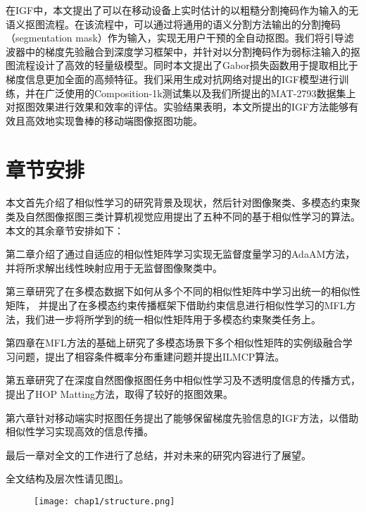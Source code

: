 在IGF中，本文提出了可以在移动设备上实时估计的以粗糙分割掩码作为输入的无语义抠图流程。在该流程中，可以通过将通用的语义分割方法输出的分割掩码（segmentation mask）作为输入，实现无用户干预的全自动抠图。我们将引导滤波器\cite{he2010guided}中的梯度先验融合到深度学习框架中，并针对以分割掩码作为弱标注输入的抠图流程设计了高效的轻量级模型。同时本文提出了Gabor损失函数用于提取相比于梯度信息更加全面的高频特征。我们采用生成对抗网络对提出的IGF模型进行训练，并在广泛使用的Composition-1k测试集以及我们所提出的MAT-2793数据集上对抠图效果进行效果和效率的评估。实验结果表明，本文所提出的IGF方法能够有效且高效地实现鲁棒的移动端图像抠图功能。



\section{章节安排}
本文首先介绍了相似性学习的研究背景及现状，然后针对图像聚类、多模态约束聚类及自然图像抠图三类计算机视觉应用提出了五种不同的基于相似性学习的算法。
本文的其余章节安排如下：

第二章介绍了通过自适应的相似性矩阵学习实现无监督度量学习的AdaAM方法，并将所求解出线性映射应用于无监督图像聚类中。

第三章研究了在多模态数据下如何从多个不同的相似性矩阵中学习出统一的相似性矩阵，
并提出了在多模态约束传播框架下借助约束信息进行相似性学习的MFL方法，我们进一步将所学到的统一相似性矩阵用于多模态约束聚类任务上。

第四章在MFL方法的基础上研究了多模态场景下多个相似性矩阵的实例级融合学习问题，提出了相容条件概率分布重建问题并提出ILMCP算法。

第五章研究了在深度自然图像抠图任务中相似性学习及不透明度信息的传播方式，提出了HOP Matting方法，取得了较好的抠图效果。

第六章针对移动端实时抠图任务提出了能够保留梯度先验信息的IGF方法，以借助相似性学习实现高效的信息传播。

最后一章对全文的工作进行了总结，并对未来的研究内容进行了展望。

全文结构及层次性请见图\ref{fig1:stru}。

\begin{figure}[t]
	\centering
	\texttt{[image: chap1/structure.png]}
	\label{fig1:stru}
\end{figure} 